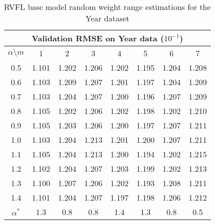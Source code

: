 \documentclass{article}
\begin{document}
\begin{table}[H]
\footnotesize 
\centering
\caption{RVFL base model random weight range estimations for the Year dataset}
\label{Talbe_RVFLE2}
\begin{tabular}{c|ccccccc}\hline
\multicolumn{8}{c}{Validation RMSE on Year data ($10^{-1}$)} \\ \hline
\multicolumn{1}{c|}{$\alpha \setminus m$} & \multicolumn{1}{c}{1} & \multicolumn{1}{c}{2} & \multicolumn{1}{c}{3} & \multicolumn{1}{c}{4} & \multicolumn{1}{c}{5} & \multicolumn{1}{c}{6} & \multicolumn{1}{c}{7}\\ \hline
0.5 & 1.101 & 1.202 & 1.206 & 1.202 & 1.195 & 1.204 & 1.208 \\
0.6 & 1.103 & 1.209 & 1.207 & 1.201 & 1.197 & 1.204 & 1.209 \\
0.7 & 1.103 & 1.204 & 1.207 & 1.200 & 1.196 & 1.207 & 1.209 \\
0.8 & 1.105 & 1.202 & 1.206 & 1.202 & 1.198 & 1.202 & 1.210 \\
0.9 & 1.105 & 1.203 & 1.206 & 1.200 & 1.197 & 1.207 & 1.211 \\
1.0 & 1.103 & 1.204 & 1.213 & 1.201 & 1.200 & 1.207 & 1.211 \\
1.1 & 1.105 & 1.204 & 1.213 & 1.200 & 1.194 & 1.202 & 1.215 \\
1.2 & 1.102 & 1.204 & 1.207 & 1.203 & 1.199 & 1.202 & 1.213 \\
1.3 & 1.100 & 1.207 & 1.206 & 1.202 & 1.193 & 1.208 & 1.211 \\
1.4 & 1.101 & 1.204 & 1.207 & 1.197 & 1.198 & 1.206 & 1.212 \\\hline
$\alpha^*$ & 1.3   & 0.8   & 0.8   & 1.4   & 1.3   & 0.8   & 0.5  \\\hline
\end{tabular}
\end{table}
\end{document}
